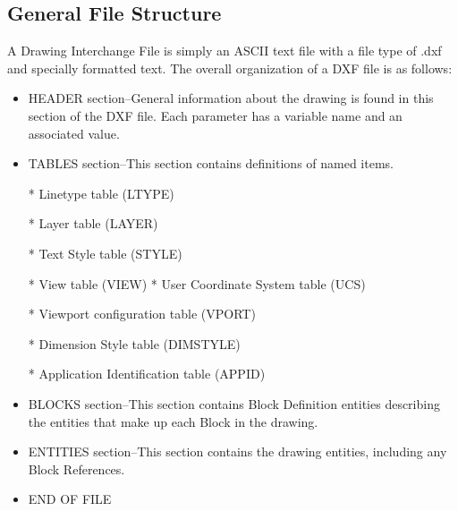 \subsection {General File Structure}
A Drawing Interchange File is simply an ASCII text file with a file type of .dxf and specially formatted text. The overall organization of a DXF file is as follows:
\begin{itemize}
\item HEADER section--General information about the drawing is found in this section of the DXF file. Each parameter has a variable name and an associated value.

\item TABLES section--This section contains definitions of named items.

* Linetype table (LTYPE)

* Layer table (LAYER)

* Text Style table (STYLE)

* View table (VIEW)
* User Coordinate System table (UCS)

* Viewport configuration table (VPORT)

* Dimension Style table (DIMSTYLE)

* Application Identification table (APPID)

\item BLOCKS section--This section contains Block Definition entities describing the entities that make up each Block in the drawing.

\item ENTITIES section--This section contains the drawing entities, including any Block References.

\item END OF FILE
\end{itemize}




